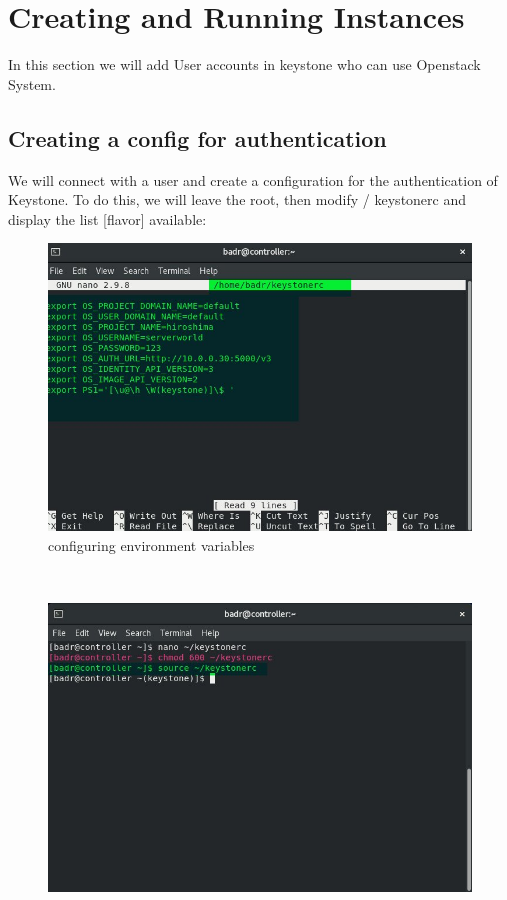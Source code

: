 \chapter{Creating and Running Instances}
\par In this section we will add User accounts in keystone who can use Openstack System.
\begin{spacing}{1.2}
\section{Creating a config for authentication}

\par We will connect with a user and create a configuration for the authentication of
Keystone. To do this, we will leave the root, then modify  / keystonerc and display the list
[flavor] available: 
\\
\begin{figure}[!htb] 
\begin{center} 
\includegraphics[width=1\linewidth]{Cloud/Creating and Running Instances/configuring environment variables} 
\end{center} 
\caption{configuring environment variables} 
\end{figure} 
\FloatBarrier
\\
\begin{figure}[!htb] 
\begin{center} 
\includegraphics[width=1\linewidth]{Cloud/Creating and Running Instances/chmod and source} 

\end{center}
\end{figure}
\end{spacing}
